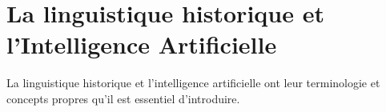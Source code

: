\documentclass[12pt, twoside]{report}
\begin{document}




\chapter{La linguistique historique et l'Intelligence Artificielle}

La linguistique historique et l'intelligence artificielle ont leur terminologie et concepts propres qu'il est essentiel d'introduire.
\end{document}
